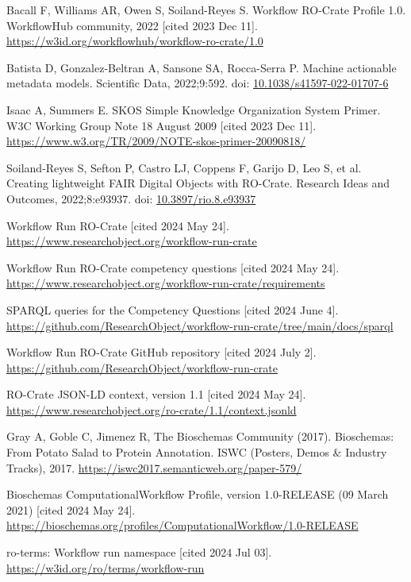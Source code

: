 \documentclass[10pt,letterpaper]{article}
\begin{document}
\begin{thebibliography}{10}
\begin{small}
Bacall F, Williams AR, Owen S, Soiland-Reyes S.
Workflow RO-Crate Profile 1.0.
WorkflowHub community, 2022 [cited 2023 Dec 11].
\url{https://w3id.org/workflowhub/workflow-ro-crate/1.0}

Batista D, Gonzalez-Beltran A, Sansone SA, Rocca-Serra P.
Machine actionable metadata models.
Scientific Data, 2022;9:592.
doi: \href{https://doi.org/10.1038/s41597-022-01707-6}{10.1038/s41597-022-01707-6}

Isaac A, Summers E.
SKOS Simple Knowledge Organization System Primer.
W3C Working Group Note 18 August 2009 [cited 2023 Dec 11].
\url{https://www.w3.org/TR/2009/NOTE-skos-primer-20090818/}

Soiland-Reyes S, Sefton P, Castro LJ, Coppens F, Garijo D, Leo S, et al.
Creating lightweight FAIR Digital Objects with RO-Crate.
Research Ideas and Outcomes, 2022;8:e93937.
doi: \href{https://doi.org/10.3897/rio.8.e93937}{10.3897/rio.8.e93937}

Workflow Run RO-Crate [cited 2024 May 24].
\url{https://www.researchobject.org/workflow-run-crate}

Workflow Run RO-Crate competency questions [cited 2024 May 24].
\url{https://www.researchobject.org/workflow-run-crate/requirements}

SPARQL queries for the Competency Questions [cited 2024 June 4].
\url{https://github.com/ResearchObject/workflow-run-crate/tree/main/docs/sparql}

Workflow Run RO-Crate GitHub repository [cited 2024 July 2].
\url{https://github.com/ResearchObject/workflow-run-crate}

RO-Crate JSON-LD context, version 1.1 [cited 2024 May 24].
\url{https://www.researchobject.org/ro-crate/1.1/context.jsonld}

Gray A, Goble C, Jimenez R, The Bioschemas Community (2017).
Bioschemas: From Potato Salad to Protein Annotation.
ISWC (Posters, Demos \& Industry Tracks), 2017.
\url{https://iswc2017.semanticweb.org/paper-579/}

Bioschemas ComputationalWorkflow Profile, version 1.0-RELEASE (09 March 2021) [cited 2024 May 24].
\url{https://bioschemas.org/profiles/ComputationalWorkflow/1.0-RELEASE}

ro-terms: Workflow run namespace [cited 2024 Jul 03].
\url{https://w3id.org/ro/terms/workflow-run}


\end{small}
\end{thebibliography}
\end{document}
